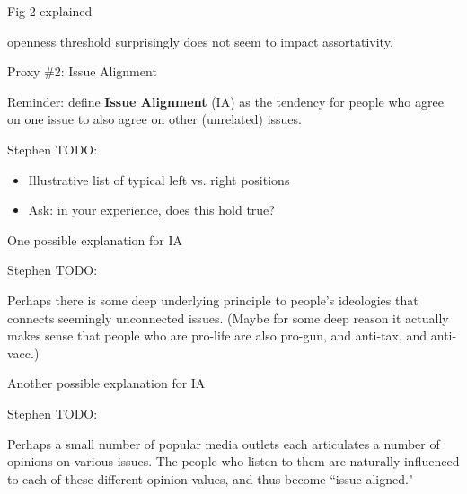 \documentclass[12pt]{beamer}
\begin{document}
\begin{frame}[c]{Fig 2 explained}  %


openness threshold surprisingly does not seem to impact assortativity.

\end{frame}

\begin{frame}[c]{Proxy \#2: Issue Alignment} %

Reminder: define \textbf{Issue Alignment} (IA) as the tendency for people who agree on
one issue to also agree on other (unrelated) issues.

{\tiny \color{red} 
Stephen TODO:

\begin{itemize}
\itemsep.1em
\item Illustrative list of typical left vs. right positions
\item Ask: in your experience, does this hold true?
\end{itemize}
}

\end{frame}
\begin{frame}[c]{One possible explanation for IA} %

{\tiny \color{red} 
Stephen TODO:

Perhaps there is some deep underlying principle to people's ideologies that
connects seemingly unconnected issues. (Maybe for some deep reason it actually
makes sense that people who are pro-life are also pro-gun, and anti-tax, and
anti-vacc.)
}

\end{frame}

\begin{frame}[c]{Another possible explanation for IA} %

{\tiny \color{red} 
Stephen TODO:

Perhaps a small number of popular media outlets each articulates a number of
opinions on various issues. The people who listen to them are naturally
influenced to each of these different opinion values, and thus become ``issue
aligned."
}

\end{frame}
\end{document}
